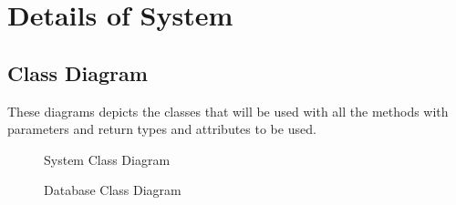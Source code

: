 \documentclass[12pt]{article}
\begin{document}
		\vspace{0.5cm}

\newpage
\section{Details of System}
	\vspace{0.5cm}
	
	\subsection{Class Diagram}
	\vspace{0.5cm}
	
	These diagrams depicts the classes that will be used with all the methods with parameters and return types and attributes to be used.
	
		\begin{figure}[htbp]
			\centering
			\caption{System Class Diagram}
		\end{figure}
		
		\begin{figure}[htbp]
			\centering
			\caption{Database Class Diagram}
		\end{figure}
\end{document}

